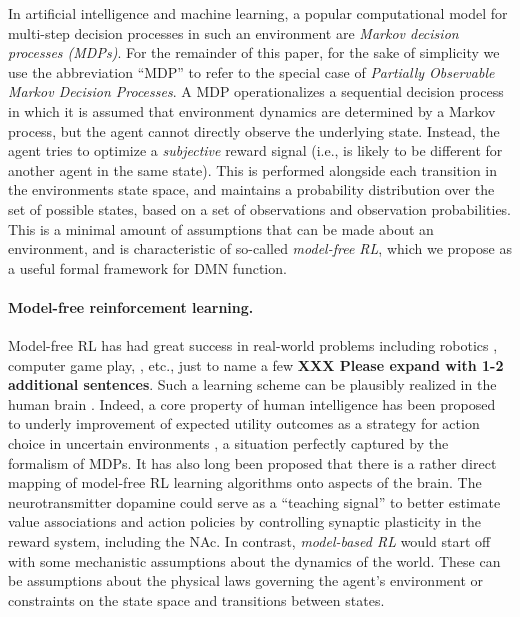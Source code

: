 \documentclass[10pt,letterpaper]{article}
\begin{document}
In artificial intelligence and machine learning, a popular computational model for
multi-step decision processes in such an environment are
\textit{Markov decision processes (MDPs)}\citep{sutton1998reinforcement}.
For the remainder of this paper, for the sake of simplicity
we use the abbreviation ``MDP'' to refer to the special case
of \textit{Partially Observable Markov Decision Processes}.
A MDP operationalizes a sequential decision process
in which it is assumed that environment dynamics are determined by a Markov process,
but the agent cannot directly observe the underlying state.
Instead, the agent tries to optimize a \textit{subjective} reward
signal (i.e., is likely to be different for another agent in the same state).
This is performed alongside each transition in the environments state space, and maintains a probability distribution over the set of possible
states, based on a set of observations and observation probabilities. This is a minimal amount of assumptions that can be made about an environment,
and is characteristic of so-called \textit{model-free RL},
which we propose as a useful formal framework for DMN function.
%


\paragraph{Model-free reinforcement learning.}
Model-free RL has had great success in real-world problems including robotics \citep{abbeel2004,andrewng}, computer game play, \citep{mnih2015,silver2016mastering},
etc., just to name a few \textbf{XXX Please expand with 1-2 additional sentences}.
Such a learning scheme can be
plausibly realized in the human brain \citep{doherty2015structure}. Indeed,
a core property of human intelligence has been proposed to underly improvement
of expected utility outcomes as a strategy for action choice in uncertain
environments \citep{gershman2015computational}, a situation perfectly captured by the formalism of MDPs.
It has also long been proposed \citep{dayan2008decision} that there
is a rather direct mapping of model-free RL learning algorithms
onto aspects of the brain.
The neurotransmitter dopamine could serve
as a ``teaching signal'' to better estimate value associations
and action policies by controlling
synaptic plasticity in the reward system, including the NAc.
In contrast, \textit{model-based RL} would start off with some mechanistic assumptions about the dynamics of the world.
These can be assumptions about the physical laws governing the agent's environment or constraints on the state space and transitions between states.
%
\end{document}
